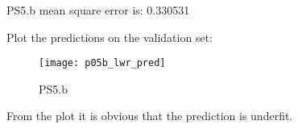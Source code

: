 \begin{answer}

PS5.b mean square error is: 0.330531

Plot the predictions on the validation set:

\begin{figure}[h]
    \centering
    \texttt{[image: p05b\_lwr\_pred]}
    \caption{PS5.b}
\end{figure}

From the plot it is obvious that the prediction is underfit.
\end{answer}
